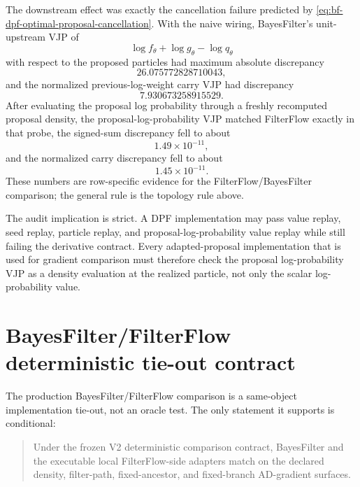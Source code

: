 The downstream effect was exactly the cancellation failure predicted by
\eqref{eq:bf-dpf-optimal-proposal-cancellation}.  With the naive wiring,
BayesFilter's unit-upstream VJP of
\[
  \log f_\theta+\log g_\theta-\log q_\theta
\]
with respect to the proposed particles had maximum absolute discrepancy
\[
  26.075772828710043 ,
\]
and the normalized previous-log-weight carry VJP had discrepancy
\[
  7.930673258915529 .
\]
After evaluating the proposal log probability through a freshly recomputed
proposal density, the proposal-log-probability VJP matched FilterFlow exactly
in that probe, the signed-sum discrepancy fell to about
\[
  1.49\times 10^{-11},
\]
and the normalized carry discrepancy fell to about
\[
  1.45\times 10^{-11}.
\]
These numbers are row-specific evidence for the FilterFlow/BayesFilter
comparison; the general rule is the topology rule above.

The audit implication is strict.  A DPF implementation may pass value replay,
seed replay, particle replay, and proposal-log-probability value replay while
still failing the derivative contract.  Every adapted-proposal implementation
that is used for gradient comparison must therefore check the proposal
log-probability VJP as a density evaluation at the realized particle, not only
the scalar log-probability value.

\section{BayesFilter/FilterFlow deterministic tie-out contract}
\label{sec:bf-dpf-bf-filterflow-deterministic-tieout}

The production BayesFilter/FilterFlow comparison is a same-object
implementation tie-out, not an oracle test.  The only statement it supports is
conditional:

\begin{quote}
Under the frozen V2 deterministic comparison contract, BayesFilter and the
executable local FilterFlow-side adapters match on the declared density,
filter-path, fixed-ancestor, and fixed-branch AD-gradient surfaces.
\end{quote}

